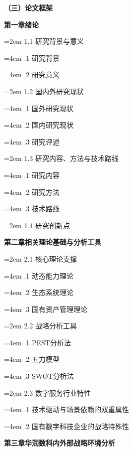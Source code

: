 \documentclass[UTF8, a4paper, 11pt]{ctexart}
\begin{document}
\begin{UnifiedBox}
\vspace{0.5cm}
\noindent \textbf{（三）论文框架}

\vspace{0.2cm}
\noindent \textbf{第一章\quad 绪论}

\hangindent=2em 
1.1 研究背景与意义

\hangindent=4em 
.1 研究背景

\hangindent=4em 
.2 研究意义

\hangindent=2em 
1.2 国内外研究现状

\hangindent=4em 
.1 国外研究现状

\hangindent=4em 
.2 国内研究现状

\hangindent=4em 
.3 研究评述

\hangindent=2em 
1.3 研究内容、方法与技术路线

\hangindent=4em 
.1 研究内容

\hangindent=4em 
.2 研究方法

\hangindent=4em 
.3 技术路线

\hangindent=2em 
1.4 研究创新点

\vspace{0.3cm}
\noindent \textbf{第二章\quad 相关理论基础与分析工具}

\hangindent=2em 
2.1 核心理论支撑

\hangindent=4em 
.1 动态能力理论

\hangindent=4em 
.2 生态系统理论

\hangindent=4em 
.3 国有资产管理理论

\hangindent=2em 
2.2 战略分析工具

\hangindent=4em 
.1 PEST分析法

\hangindent=4em 
.2 五力模型

\hangindent=4em 
.3 SWOT分析法

\hangindent=2em 
2.3 数字服务行业特性

\hangindent=4em 
.1 技术驱动与场景依赖的双重属性

\hangindent=4em 
.2 国有数字科技企业的战略特殊性

\vspace{0.3cm}
\noindent \textbf{第三章\quad 华润数科内外部战略环境分析}


\end{UnifiedBox}
\end{document}
